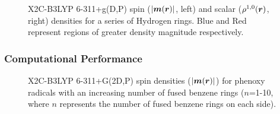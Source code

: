 \begin{figure}
\begin{center}
\end{center}
\caption{X2C-B3LYP  6-311+g(D,P) spin ($\vert \boldsymbol{m}(\boldsymbol{r})\vert$, left) and scalar ($\rho^{1,0}(\boldsymbol{r})$, right) densities for a series of Hydrogen rings.
Blue and Red represent regions of greater density magnitude respectively.}
\label{fig:rings}       
\end{figure}

\subsubsection{Computational Performance}

\begin{figure}
\begin{center}
\end{center}
\caption{X2C-B3LYP 6-311+G(2D,P) spin densities ($\vert\boldsymbol{m}(\boldsymbol{r})\vert$) for phenoxy radicals with an increasing number of fused benzene rings 
($n$=1-10, where $n$ represents the number of fused benzene rings on each side).}
\label{fig:radicals}       
\end{figure}

